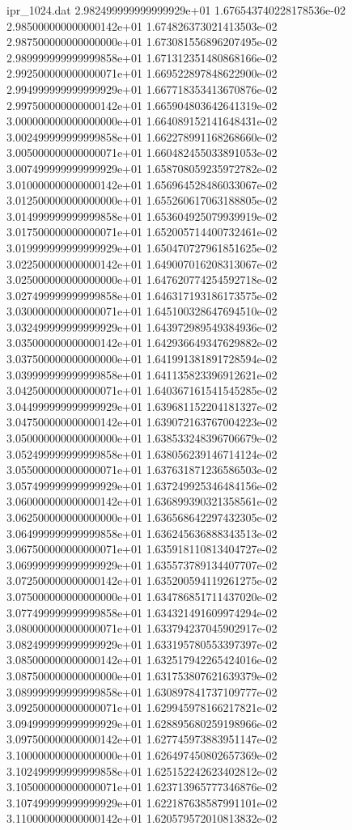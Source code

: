 \begin{filecontents}{ipr_1024.dat}
2.982499999999999929e+01 1.676543740228178536e-02
2.985000000000000142e+01 1.674826373021413503e-02
2.987500000000000000e+01 1.673081556896207495e-02
2.989999999999999858e+01 1.671312351480868166e-02
2.992500000000000071e+01 1.669522897848622900e-02
2.994999999999999929e+01 1.667718353413670876e-02
2.997500000000000142e+01 1.665904803642641319e-02
3.000000000000000000e+01 1.664089152141648431e-02
3.002499999999999858e+01 1.662278991168268660e-02
3.005000000000000071e+01 1.660482455033891053e-02
3.007499999999999929e+01 1.658708059235972782e-02
3.010000000000000142e+01 1.656964528486033067e-02
3.012500000000000000e+01 1.655260617063188805e-02
3.014999999999999858e+01 1.653604925079939919e-02
3.017500000000000071e+01 1.652005714400732461e-02
3.019999999999999929e+01 1.650470727961851625e-02
3.022500000000000142e+01 1.649007016208313067e-02
3.025000000000000000e+01 1.647620774254592718e-02
3.027499999999999858e+01 1.646317193186173575e-02
3.030000000000000071e+01 1.645100328647694510e-02
3.032499999999999929e+01 1.643972989549384936e-02
3.035000000000000142e+01 1.642936649347629882e-02
3.037500000000000000e+01 1.641991381891728594e-02
3.039999999999999858e+01 1.641135823396912621e-02
3.042500000000000071e+01 1.640367161541545285e-02
3.044999999999999929e+01 1.639681152204181327e-02
3.047500000000000142e+01 1.639072163767004223e-02
3.050000000000000000e+01 1.638533248396706679e-02
3.052499999999999858e+01 1.638056239146714124e-02
3.055000000000000071e+01 1.637631871236586503e-02
3.057499999999999929e+01 1.637249925346484156e-02
3.060000000000000142e+01 1.636899390321358561e-02
3.062500000000000000e+01 1.636568642297432305e-02
3.064999999999999858e+01 1.636245636888343513e-02
3.067500000000000071e+01 1.635918110813404727e-02
3.069999999999999929e+01 1.635573789134407707e-02
3.072500000000000142e+01 1.635200594119261275e-02
3.075000000000000000e+01 1.634786851711437020e-02
3.077499999999999858e+01 1.634321491609974294e-02
3.080000000000000071e+01 1.633794237045902917e-02
3.082499999999999929e+01 1.633195780553397397e-02
3.085000000000000142e+01 1.632517942265424016e-02
3.087500000000000000e+01 1.631753807621639379e-02
3.089999999999999858e+01 1.630897841737109777e-02
3.092500000000000071e+01 1.629945978166217821e-02
3.094999999999999929e+01 1.628895680259198966e-02
3.097500000000000142e+01 1.627745973883951147e-02
3.100000000000000000e+01 1.626497450802657369e-02
3.102499999999999858e+01 1.625152242623402812e-02
3.105000000000000071e+01 1.623713965777346876e-02
3.107499999999999929e+01 1.622187638587991101e-02
3.110000000000000142e+01 1.620579572010813832e-02

\end{filecontents}

